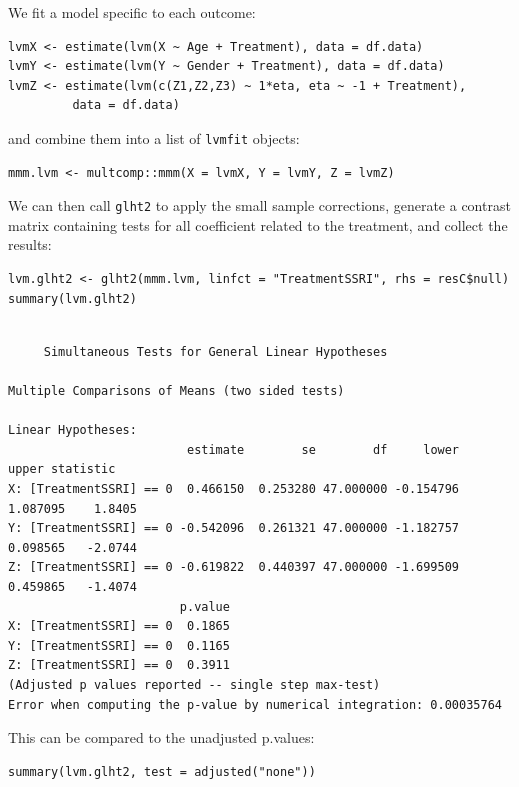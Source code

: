\documentclass[12pt]{article}
\begin{document}
We fit a model specific to each outcome:
\lstset{language=r,label= ,caption= ,captionpos=b,numbers=none}
\begin{lstlisting}
lvmX <- estimate(lvm(X ~ Age + Treatment), data = df.data)
lvmY <- estimate(lvm(Y ~ Gender + Treatment), data = df.data)
lvmZ <- estimate(lvm(c(Z1,Z2,Z3) ~ 1*eta, eta ~ -1 + Treatment), 
		 data = df.data)
\end{lstlisting}

and combine them into a list of \texttt{lvmfit} objects:
\lstset{language=r,label= ,caption= ,captionpos=b,numbers=none}
\begin{lstlisting}
mmm.lvm <- multcomp::mmm(X = lvmX, Y = lvmY, Z = lvmZ)
\end{lstlisting}

We can then call \texttt{glht2} to apply the small sample corrections,
generate a contrast matrix containing tests for all coefficient
related to the treatment, and collect the results:
\lstset{language=r,label= ,caption= ,captionpos=b,numbers=none}
\begin{lstlisting}
lvm.glht2 <- glht2(mmm.lvm, linfct = "TreatmentSSRI", rhs = resC$null)
summary(lvm.glht2)
\end{lstlisting}

\begin{verbatim}

	 Simultaneous Tests for General Linear Hypotheses

Multiple Comparisons of Means (two sided tests) 

Linear Hypotheses:
                         estimate        se        df     lower     upper statistic
X: [TreatmentSSRI] == 0  0.466150  0.253280 47.000000 -0.154796  1.087095    1.8405
Y: [TreatmentSSRI] == 0 -0.542096  0.261321 47.000000 -1.182757  0.098565   -2.0744
Z: [TreatmentSSRI] == 0 -0.619822  0.440397 47.000000 -1.699509  0.459865   -1.4074
                        p.value
X: [TreatmentSSRI] == 0  0.1865
Y: [TreatmentSSRI] == 0  0.1165
Z: [TreatmentSSRI] == 0  0.3911
(Adjusted p values reported -- single step max-test) 
Error when computing the p-value by numerical integration: 0.00035764
\end{verbatim}

This can be compared to the unadjusted p.values:
\lstset{language=r,label= ,caption= ,captionpos=b,numbers=none}
\begin{lstlisting}
summary(lvm.glht2, test = adjusted("none"))
\end{lstlisting}
\end{document}
